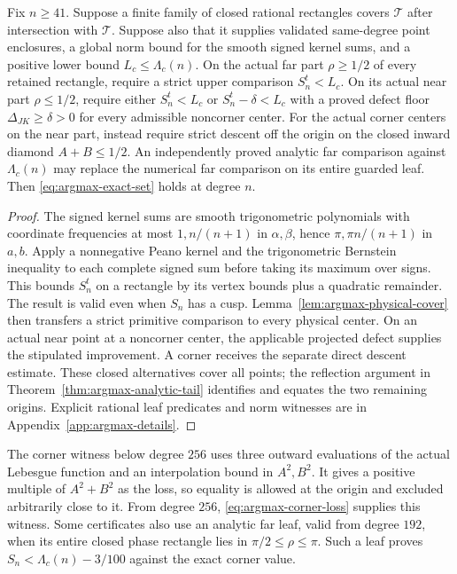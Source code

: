 \begin{proposition}
\label{prop:certificate-phase-soundness}
Fix $n\geq41$.  Suppose a finite family of closed rational rectangles
covers $\mathcal T$ after intersection with $\mathcal T$.  Suppose also
that it supplies validated same-degree point enclosures, a global norm
bound for the smooth signed kernel sums, and a positive lower bound
$L_c\leq\Lambda_c(n)$.  On the actual far part $\rho\geq1/2$ of every
retained rectangle, require a strict upper comparison $S_n^t<L_c$.
On its actual near part $\rho\leq1/2$, require either $S_n^t<L_c$ or
$S_n^t-\delta<L_c$ with a proved defect floor $\Delta_{JK}\geq\delta>0$
for every admissible noncorner center.  For the actual corner centers
on the near part, instead require strict descent off the origin on the
closed inward diamond $A+B\leq1/2$.  An independently proved analytic
far comparison against $\Lambda_c(n)$ may replace the numerical far
comparison on its entire guarded leaf.  Then
\eqref{eq:argmax-exact-set} holds at degree $n$.
\end{proposition}

\begin{proof}
The signed kernel sums are smooth trigonometric polynomials with
coordinate frequencies at most $1,n/(n+1)$ in $\alpha,\beta$, hence
$\pi,\pi n/(n+1)$ in $a,b$.  Apply a nonnegative Peano
kernel and the trigonometric Bernstein inequality to each complete
signed sum before taking its maximum over signs.  This bounds $S_n^t$
on a rectangle by its vertex bounds plus a quadratic remainder.  The
result is valid even when $S_n$ has a cusp.  Lemma~\ref{lem:argmax-physical-cover}
then transfers a strict primitive comparison to every physical center.
On an actual near point at a noncorner center, the applicable projected
defect supplies the stipulated improvement.  A corner receives the
separate direct descent estimate.  These closed alternatives cover all
points; the reflection argument in Theorem~\ref{thm:argmax-analytic-tail}
identifies and equates the two remaining origins.  Explicit rational
leaf predicates and norm witnesses are in
Appendix~\ref{app:argmax-details}.
\end{proof}

The corner witness below degree $256$ uses three outward evaluations of
the actual Lebesgue function and an interpolation bound in $A^2,B^2$.
It gives a positive multiple of $A^2+B^2$ as the loss, so equality is
allowed at the origin and excluded arbitrarily close to it.  From
degree $256$, \eqref{eq:argmax-corner-loss} supplies this witness.
Some certificates also use an analytic far leaf, valid from degree
$192$, when its entire closed phase rectangle lies in
$\pi/2\leq\rho\leq\pi$.  Such a leaf proves
$S_n<\Lambda_c(n)-3/100$ against the exact corner value.

